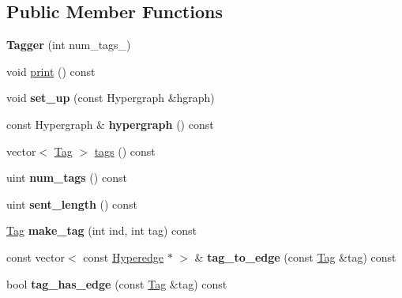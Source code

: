 \subsection*{Public Member Functions}
\begin{DoxyCompactItemize}
\item 
\hypertarget{classTagger_a6e812fd7e339a21155f7b30f04292be1}{
{\bfseries Tagger} (int num\_\-tags\_\-)}
\label{classTagger_a6e812fd7e339a21155f7b30f04292be1}

\item 
void \hyperlink{classTagger_a4ebe0aebd7c0392970b401a5a6c6cd72}{print} () const 
\item 
\hypertarget{classTagger_afafa6e435d17467db344ca615f24746f}{
void {\bfseries set\_\-up} (const Hypergraph \&hgraph)}
\label{classTagger_afafa6e435d17467db344ca615f24746f}

\item 
\hypertarget{classTagger_ad694ed218149b86c4ef5253328a41c49}{
const Hypergraph \& {\bfseries hypergraph} () const }
\label{classTagger_ad694ed218149b86c4ef5253328a41c49}

\item 
vector$<$ \hyperlink{structTag}{Tag} $>$ \hyperlink{classTagger_ae1e3802fb545c3430ca4d52ea5fd95db}{tags} () const 
\item 
\hypertarget{classTagger_a5da221998377bf36c84013ba0d471b36}{
uint {\bfseries num\_\-tags} () const }
\label{classTagger_a5da221998377bf36c84013ba0d471b36}

\item 
\hypertarget{classTagger_ae762dd21f446b9ec618b0b83204bdc2e}{
uint {\bfseries sent\_\-length} () const }
\label{classTagger_ae762dd21f446b9ec618b0b83204bdc2e}

\item 
\hypertarget{classTagger_af01daf511528271a118a281b8595e0df}{
\hyperlink{structTag}{Tag} {\bfseries make\_\-tag} (int ind, int tag) const }
\label{classTagger_af01daf511528271a118a281b8595e0df}

\item 
\hypertarget{classTagger_a26472c386e7f5eebcb05c9d1843c1975}{
const vector$<$ const \hyperlink{classScarab_1_1HG_1_1Hyperedge}{Hyperedge} $\ast$ $>$ \& {\bfseries tag\_\-to\_\-edge} (const \hyperlink{structTag}{Tag} \&tag) const }
\label{classTagger_a26472c386e7f5eebcb05c9d1843c1975}

\item 
\hypertarget{classTagger_ae270a5be64b93945c180996aedcf6372}{
bool {\bfseries tag\_\-has\_\-edge} (const \hyperlink{structTag}{Tag} \&tag) const }
\label{classTagger_ae270a5be64b93945c180996aedcf6372}


\end{DoxyCompactItemize}
